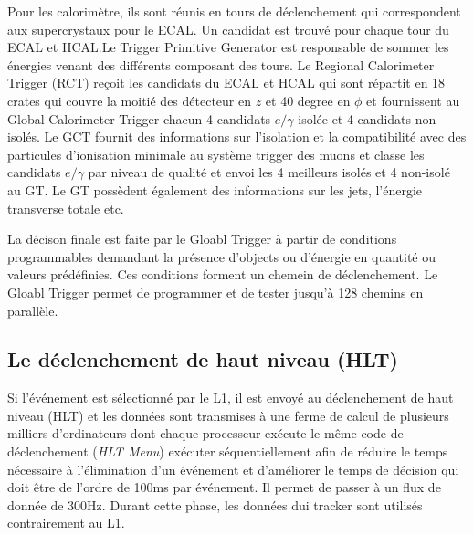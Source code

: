 Pour les calorimètre, ils sont réunis en tours de déclenchement qui correspondent aux supercrystaux pour le ECAL. Un candidat est trouvé pour chaque tour du ECAL et HCAL.Le Trigger Primitive Generator est responsable de sommer les énergies venant des différents composant des tours.  Le Regional Calorimeter Trigger (RCT) reçoit les candidats du ECAL et HCAL qui sont répartit en 18 crates qui couvre la moitié des détecteur en $z$ et 40 degree en $\phi$ et fournissent au Global Calorimeter Trigger chacun 4 candidats $e/\gamma$ isolée et 4 candidats non-isolés. Le GCT fournit des informations sur l'isolation et la compatibilité avec des particules d'ionisation minimale au système trigger des muons et classe les candidats $e/\gamma$ par niveau de qualité et envoi les 4 meilleurs isolés et 4 non-isolé au GT. Le GT possèdent également des informations sur les jets, l'énergie transverse totale etc.

La décison finale est faite par le Gloabl Trigger à partir de conditions programmables demandant la présence d'objects ou d'énergie en quantité ou valeurs prédéfinies. Ces conditions forment un chemein de déclenchement. Le Gloabl Trigger permet de programmer et de tester jusqu'à 128 chemins en parallèle. 

\subsection{Le déclenchement de haut niveau (HLT)}
Si l'événement est sélectionné par le L1, il est envoyé au déclenchement de haut niveau (HLT) et les données sont transmises à une ferme de calcul de plusieurs milliers d'ordinateurs  dont chaque processeur exécute le même code de déclenchement (\textit{HLT Menu}) exécuter séquentiellement afin de réduire le temps nécessaire à l'élimination d'un événement et d'améliorer le temps de décision qui doit être de l'ordre de 100ms par événement. Il permet de passer à un flux de donnée de 300Hz. Durant cette phase, les données dui tracker sont utilisés contrairement au L1.

